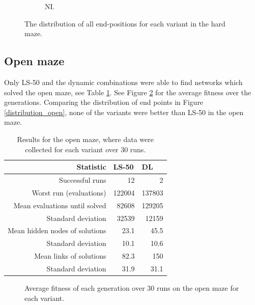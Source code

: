 \begin{figure}[H]
\begin{mdframed}
\begin{subfigure}[t]{0.5\textwidth}
            \caption{NI.}
        \end{subfigure}
    \end{mdframed}
    \caption{The distribution of all end-positions for each variant in the hard maze.}
    \label{distribution}
\end{figure}

\subsection{Open maze}
Only LS-50 and the dynamic combinations were able to find networks which solved the open maze, see Table \ref{open}.
See Figure \ref{open_fitness} for the average fitness over the generations. Comparing the distribution of end points in Figure \ref{distribution_open},
none of the variants were better than LS-50 in the open maze.
\begin{table}[H]
    \centering
    \begin{tabular}{rrr}
    \toprule
    Statistic & \multicolumn{1}{l}{LS-50} & \multicolumn{1}{l}{DL} \\
    \midrule
    Successful runs & 12 & 2 \\
    Worst run (evaluations) & 122004 & 137803 \\
    \rowcolor[gray]{.9} Mean evaluations until solved & 82608 & 129205 \\
    Standard deviation & 32539  & 12159 \\
    \rowcolor[gray]{.9} Mean hidden nodes of solutions & 23.1 & 45.5 \\
    Standard deviation & 10.1 & 10.6 \\
    \rowcolor[gray]{.9} Mean links of solutions & 82.3  & 150 \\
    Standard deviation & 31.9  & 31.1 \\
    \bottomrule
    \end{tabular}
    \caption{Results for the open maze, where data were collected for each variant over 30 runs.}
    \label{open}
\end{table}

\begin{figure}[H]
    \begin{center}
        
    \end{center}
    \caption{Average fitness of each generation over 30 runs on the open maze for each variant.}
    \label{open_fitness}
\end{figure}

